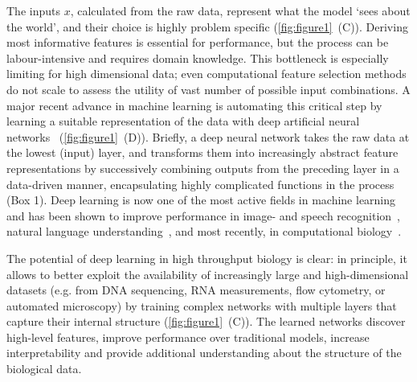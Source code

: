 The inputs $x$, calculated from the raw data, represent what the model `sees about the world', and their choice is highly problem specific (\autoref{fig:figure1}~(C)). Deriving most informative features is essential for performance, but the process can be labour-intensive and requires domain knowledge. This bottleneck is especially limiting for high dimensional data; even computational feature selection methods do not scale to assess the utility of vast number of possible input combinations. A major recent advance in machine learning is automating this critical step by learning a suitable representation of the data with deep artificial neural networks~\citep{bengio_representation_2013,lecun_deep_2015,schmidhuber_deep_2015} (\autoref{fig:figure1}~(D)). Briefly, a deep neural network takes the raw data at the lowest (input) layer, and transforms them into increasingly abstract feature representations by successively combining outputs from the preceding layer in a data-driven manner, encapsulating highly complicated functions in the process (Box 1). Deep learning is now one of the most active fields in machine learning and has been shown to improve performance in image- and speech recognition~\citep{deng_deep_2015,graves_generating_2013,hinton_deep_2012,krizhevsky_imagenet_2012,zeiler_visualizing_2014}, natural language understanding~\citep{bahdanau_neural_2014,lipton_critical_2015,sutskever_sequence_2014,xiong_dynamic_2016}, and most recently, in computational biology~\citep{alipanahi_predicting_2015,dahl_multi-task_2014,eickholt_dndisorder:_2013,kelley_basset:_2016,leung_deep_2014,sonderby_protein_2014,wang_chromatin_2015,zhou_predicting_2015}.

The potential of deep learning in high throughput biology is clear: in principle, it allows to better exploit the availability of increasingly large and high-dimensional datasets (e.g. from DNA sequencing, RNA measurements, flow cytometry, or automated microscopy) by training complex networks with multiple layers that capture their internal structure (\autoref{fig:figure1}~(C)). The learned networks discover high-level features, improve performance over traditional models, increase interpretability and provide additional understanding about the structure of the biological data.

